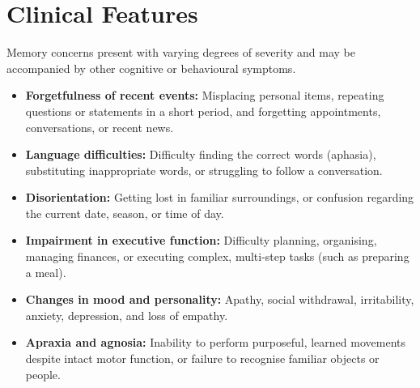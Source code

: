 \section*{Clinical Features}
Memory concerns present with varying degrees of severity and may be accompanied by other cognitive or behavioural symptoms.
\begin{itemize}
    \item \textbf{Forgetfulness of recent events:} Misplacing personal items, repeating questions or statements in a short period, and forgetting appointments, conversations, or recent news.
    \item \textbf{Language difficulties:} Difficulty finding the correct words (aphasia), substituting inappropriate words, or struggling to follow a conversation.
    \item \textbf{Disorientation:} Getting lost in familiar surroundings, or confusion regarding the current date, season, or time of day.
    \item \textbf{Impairment in executive function:} Difficulty planning, organising, managing finances, or executing complex, multi-step tasks (such as preparing a meal).
    \item \textbf{Changes in mood and personality:} Apathy, social withdrawal, irritability, anxiety, depression, and loss of empathy.
    \item \textbf{Apraxia and agnosia:} Inability to perform purposeful, learned movements despite intact motor function, or failure to recognise familiar objects or people.
\end{itemize}

